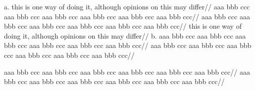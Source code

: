 \ex[glwidth=2.4in,glhangstyle=cascade,glhangindent=1em,extraglskip=0pt]
a.\quad
\begingl
\glpreamble this is one way of doing it, although opinions on this
may differ//
\gla
aaa bbb ccc
aaa bbb ccc
aaa bbb ccc
aaa bbb ccc
aaa bbb ccc
aaa bbb ccc//
\glb
aaa bbb ccc
aaa bbb ccc
aaa bbb ccc
aaa bbb ccc
aaa bbb ccc
aaa bbb ccc//
\glft this is one way of doing it, although opinions on this
may differ//
\endgl
\hfil
b.\quad
\begingl
\gla
aaa bbb ccc
aaa bbb ccc
aaa bbb ccc
aaa bbb ccc
aaa bbb ccc
aaa bbb ccc//
\glb
aaa bbb ccc
aaa bbb ccc
aaa bbb ccc
aaa bbb ccc
aaa bbb ccc
aaa bbb ccc//
\endgl
\xe

\hsize=2in
\ex[glwidth=0pt,glhangstyle=cascade,glhangindent=1em]
\begingl
\gla
aaa bbb ccc
aaa bbb ccc
aaa bbb ccc
aaa bbb ccc
aaa bbb ccc
aaa bbb ccc//
\glb
aaa bbb ccc
aaa bbb ccc
aaa bbb ccc
aaa bbb ccc
aaa bbb ccc
aaa bbb ccc//
\endgl
\xe

\endinput

\ex
\begingl[glstyle=wrap,glwidth=0pt,glbreaking=false]
\gla
aaa bbb ccc
aaa bbb ccc
aaa bbb ccc
aaa bbb ccc
aaa bbb ccc
aaa bbb ccc
aaa bbb ccc
aaa bbb ccc
aaa bbb ccc
aaa bbb ccc
//
\glb
aaa bbb ccc
aaa bbb ccc
aaa bbb ccc
aaa bbb ccc
aaa bbb ccc
aaa bbb ccc
aaa bbb ccc
aaa bbb ccc
aaa bbb ccc
aaa bbb ccc
//
\endgl
\xe
